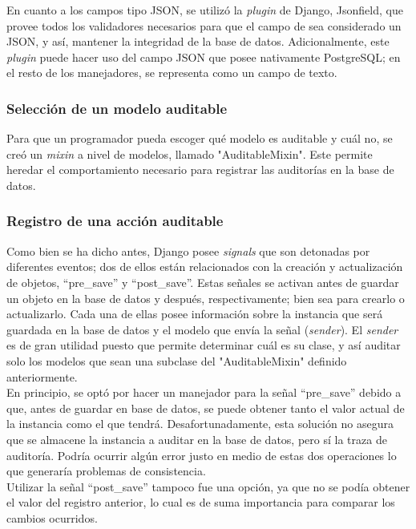 

En cuanto a los campos tipo JSON, se utilizó la \textit{plugin} de Django, Jsonfield, que provee todos los validadores necesarios para que el campo de sea considerado un JSON, y así, mantener la integridad de la base de datos. Adicionalmente, este \textit{plugin} puede hacer uso del campo JSON que posee nativamente PostgreSQL; en el resto de los manejadores, se representa como un campo de texto.

\subsubsection{Selección de un  modelo auditable}

Para que un programador pueda escoger qué modelo es auditable y cuál no, se creó un \textit{mixin} a nivel de modelos, llamado "AuditableMixin". Este permite heredar el comportamiento necesario para registrar las auditorías en la base de datos.

\subsubsection{Registro de una acción auditable}

Como bien se ha dicho antes, Django posee \textit{signals} que son detonadas por diferentes eventos; dos de ellos están relacionados con la creación y actualización de objetos, “pre\_save” y “post\_save”. Estas señales se activan antes de guardar un objeto en la base de datos y después, respectivamente; bien sea para crearlo o actualizarlo. Cada una de ellas posee información sobre la instancia que será guardada en la base de datos y el modelo que envía la señal (\textit{sender}). El \textit{sender} es de gran utilidad puesto que permite determinar cuál es su clase, y así auditar solo los modelos que sean una subclase del "AuditableMixin" definido anteriormente.\\

En principio, se optó por hacer un manejador para la señal “pre\_save” debido a que, antes de guardar en base de datos, se puede obtener tanto el valor actual de la instancia como el que tendrá. Desafortunadamente, esta solución no asegura que se almacene la instancia a auditar en la base de datos, pero sí la traza de auditoría. Podría ocurrir algún error justo en medio de estas dos operaciones lo que generaría problemas de consistencia.\\

Utilizar la señal “post\_save” tampoco fue una opción, ya que no se podía obtener el valor del registro anterior, lo cual es de suma importancia para comparar los cambios ocurridos. \\

